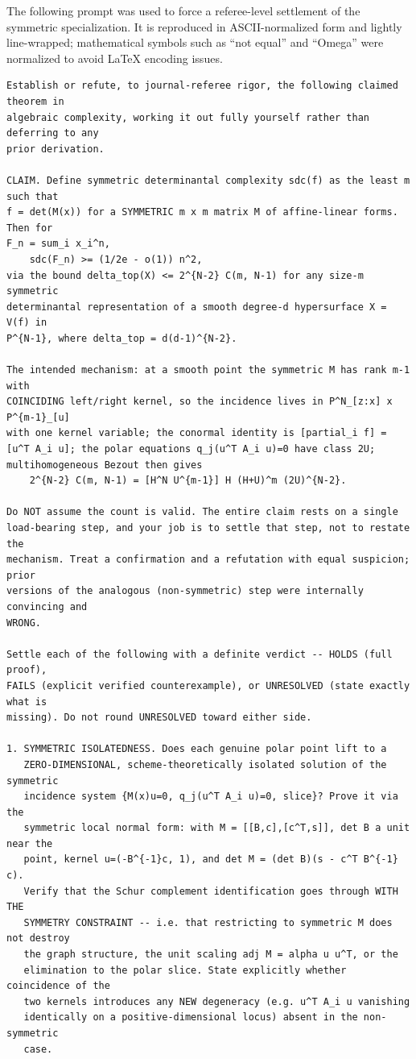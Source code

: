 \documentclass[11pt]{article}
\theoremstyle{plain}
\theoremstyle{definition}
\begin{document}
The following prompt was used to force a referee-level settlement of the
symmetric specialization.  It is reproduced in ASCII-normalized form and lightly
line-wrapped; mathematical symbols such as ``not equal'' and ``Omega'' were
normalized to avoid LaTeX encoding issues.

\begin{verbatim}
Establish or refute, to journal-referee rigor, the following claimed theorem in
algebraic complexity, working it out fully yourself rather than deferring to any
prior derivation.

CLAIM. Define symmetric determinantal complexity sdc(f) as the least m such that
f = det(M(x)) for a SYMMETRIC m x m matrix M of affine-linear forms. Then for
F_n = sum_i x_i^n,
    sdc(F_n) >= (1/2e - o(1)) n^2,
via the bound delta_top(X) <= 2^{N-2} C(m, N-1) for any size-m symmetric
determinantal representation of a smooth degree-d hypersurface X = V(f) in
P^{N-1}, where delta_top = d(d-1)^{N-2}.

The intended mechanism: at a smooth point the symmetric M has rank m-1 with
COINCIDING left/right kernel, so the incidence lives in P^N_[z:x] x P^{m-1}_[u]
with one kernel variable; the conormal identity is [partial_i f] =
[u^T A_i u]; the polar equations q_j(u^T A_i u)=0 have class 2U;
multihomogeneous Bezout then gives
    2^{N-2} C(m, N-1) = [H^N U^{m-1}] H (H+U)^m (2U)^{N-2}.

Do NOT assume the count is valid. The entire claim rests on a single
load-bearing step, and your job is to settle that step, not to restate the
mechanism. Treat a confirmation and a refutation with equal suspicion; prior
versions of the analogous (non-symmetric) step were internally convincing and
WRONG.

Settle each of the following with a definite verdict -- HOLDS (full proof),
FAILS (explicit verified counterexample), or UNRESOLVED (state exactly what is
missing). Do not round UNRESOLVED toward either side.

1. SYMMETRIC ISOLATEDNESS. Does each genuine polar point lift to a
   ZERO-DIMENSIONAL, scheme-theoretically isolated solution of the symmetric
   incidence system {M(x)u=0, q_j(u^T A_i u)=0, slice}? Prove it via the
   symmetric local normal form: with M = [[B,c],[c^T,s]], det B a unit near the
   point, kernel u=(-B^{-1}c, 1), and det M = (det B)(s - c^T B^{-1} c).
   Verify that the Schur complement identification goes through WITH THE
   SYMMETRY CONSTRAINT -- i.e. that restricting to symmetric M does not destroy
   the graph structure, the unit scaling adj M = alpha u u^T, or the
   elimination to the polar slice. State explicitly whether coincidence of the
   two kernels introduces any NEW degeneracy (e.g. u^T A_i u vanishing
   identically on a positive-dimensional locus) absent in the non-symmetric
   case.


\end{verbatim}
\end{document}
